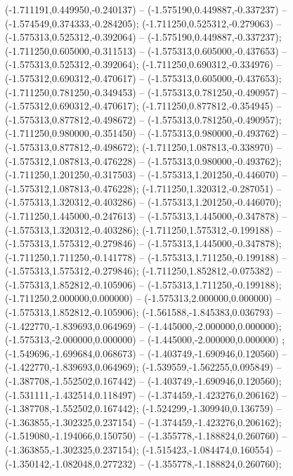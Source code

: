  (-1.711191,0.449950,-0.240137) -- (-1.575190,0.449887,-0.337237) -- (-1.574549,0.374333,-0.284205);
 (-1.711250,0.525312,-0.279063) -- (-1.575313,0.525312,-0.392064) -- (-1.575190,0.449887,-0.337237);
 (-1.711250,0.605000,-0.311513) -- (-1.575313,0.605000,-0.437653) -- (-1.575313,0.525312,-0.392064);
 (-1.711250,0.690312,-0.334976) -- (-1.575312,0.690312,-0.470617) -- (-1.575313,0.605000,-0.437653);
 (-1.711250,0.781250,-0.349453) -- (-1.575313,0.781250,-0.490957) -- (-1.575312,0.690312,-0.470617);
 (-1.711250,0.877812,-0.354945) -- (-1.575313,0.877812,-0.498672) -- (-1.575313,0.781250,-0.490957);
 (-1.711250,0.980000,-0.351450) -- (-1.575313,0.980000,-0.493762) -- (-1.575313,0.877812,-0.498672);
 (-1.711250,1.087813,-0.338970) -- (-1.575312,1.087813,-0.476228) -- (-1.575313,0.980000,-0.493762);
 (-1.711250,1.201250,-0.317503) -- (-1.575313,1.201250,-0.446070) -- (-1.575312,1.087813,-0.476228);
 (-1.711250,1.320312,-0.287051) -- (-1.575313,1.320312,-0.403286) -- (-1.575313,1.201250,-0.446070);
 (-1.711250,1.445000,-0.247613) -- (-1.575313,1.445000,-0.347878) -- (-1.575313,1.320312,-0.403286);
 (-1.711250,1.575312,-0.199188) -- (-1.575313,1.575312,-0.279846) -- (-1.575313,1.445000,-0.347878);
 (-1.711250,1.711250,-0.141778) -- (-1.575313,1.711250,-0.199188) -- (-1.575313,1.575312,-0.279846);
 (-1.711250,1.852812,-0.075382) -- (-1.575313,1.852812,-0.105906) -- (-1.575313,1.711250,-0.199188);
 (-1.711250,2.000000,0.000000) -- (-1.575313,2.000000,0.000000) -- (-1.575313,1.852812,-0.105906);
 (-1.561588,-1.845383,0.036793) -- (-1.422770,-1.839693,0.064969) -- (-1.445000,-2.000000,0.000000);
 (-1.575313,-2.000000,0.000000) -- (-1.445000,-2.000000,0.000000) ;
 (-1.549696,-1.699684,0.068673) -- (-1.403749,-1.690946,0.120560) -- (-1.422770,-1.839693,0.064969);
 (-1.539559,-1.562255,0.095849) -- (-1.387708,-1.552502,0.167442) -- (-1.403749,-1.690946,0.120560);
 (-1.531111,-1.432514,0.118497) -- (-1.374459,-1.423276,0.206162) -- (-1.387708,-1.552502,0.167442);
 (-1.524299,-1.309940,0.136759) -- (-1.363855,-1.302325,0.237154) -- (-1.374459,-1.423276,0.206162);
 (-1.519080,-1.194066,0.150750) -- (-1.355778,-1.188824,0.260760) -- (-1.363855,-1.302325,0.237154);
 (-1.515423,-1.084474,0.160554) -- (-1.350142,-1.082048,0.277232) -- (-1.355778,-1.188824,0.260760);
